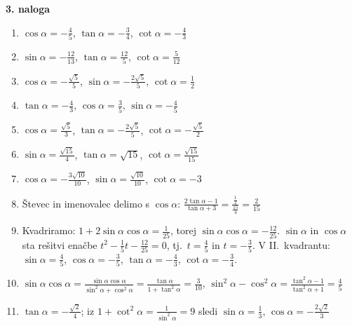 \documentclass[11pt,a4paper]{article}
\begin{document}
\textbf{3. naloga}
\begin{enumerate}[label=\alph*)]
  \item $\cos\alpha=-\frac45$, $\tan\alpha=-\frac34$, $\cot\alpha=-\frac43$
  \item $\sin\alpha=-\frac{12}{13}$, $\tan\alpha=\frac{12}{5}$, $\cot\alpha=\frac{5}{12}$
  \item $\cos\alpha=-\frac{\sqrt5}{5}$, $\sin\alpha=-\frac{2\sqrt5}{5}$, $\cot\alpha=\frac12$
  \item $\tan\alpha=-\frac43$, $\cos\alpha=\frac35$, $\sin\alpha=-\frac45$
  \item $\cos\alpha=\frac{\sqrt5}{3}$, $\tan\alpha=-\frac{2\sqrt5}{5}$, $\cot\alpha=-\frac{\sqrt5}{2}$
  \item $\sin\alpha=\frac{\sqrt{15}}{4}$, $\tan\alpha=\sqrt{15}$, $\cot\alpha=\frac{\sqrt{15}}{15}$
  \item $\cos\alpha=-\frac{3\sqrt{10}}{10}$, $\sin\alpha=\frac{\sqrt{10}}{10}$, $\cot\alpha=-3$
  \item Števec in imenovalec delimo s $\cos\alpha$: $\frac{2\tan\alpha-1}{\tan\alpha+3} = \frac{\frac12}{\frac{15}{4}} = \frac{2}{15}$
  \item Kvadriramo: $1+2\sin\alpha\cos\alpha=\frac{1}{25}$, torej $\sin\alpha\cos\alpha=-\frac{12}{25}$.
        $\sin\alpha$ in $\cos\alpha$ sta rešitvi enačbe $t^2-\frac15 t-\frac{12}{25}=0$, tj.\ $t=\frac45$ in $t=-\frac35$.
        V II.\ kvadrantu: $\sin\alpha=\frac45$, $\cos\alpha=-\frac35$, $\tan\alpha=-\frac43$, $\cot\alpha=-\frac34$.
  \item $\sin\alpha\cos\alpha=\frac{\sin\alpha\cos\alpha}{\sin^2\alpha+\cos^2\alpha}=\frac{\tan\alpha}{1+\tan^2\alpha}=\frac{3}{10}$, \quad
        $\sin^2\alpha-\cos^2\alpha=\frac{\tan^2\alpha-1}{\tan^2\alpha+1}=\frac45$
  \item $\tan\alpha=-\frac{\sqrt2}{4}$; iz $1+\cot^2\alpha=\frac{1}{\sin^2\alpha}=9$ sledi $\sin\alpha=\frac13$, $\cos\alpha=-\frac{2\sqrt2}{3}$
\end{enumerate}
\end{document}
